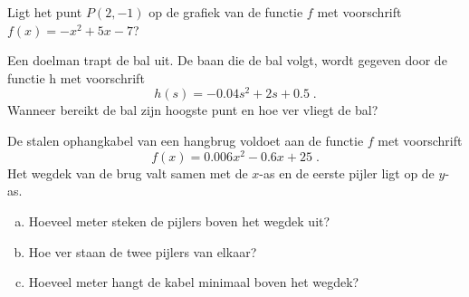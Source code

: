 \documentclass[12pt,twoside,a4paper]{article}
\begin{document}
\begin{oefening}
Ligt het punt $P(2,-1)$ op de grafiek van de functie $f$ met voorschrift $f(x)=-x^2+5x-7$?
\end{oefening}

\begin{oefening}
Een doelman trapt de bal uit. De baan die de bal volgt, wordt gegeven door de functie h met voorschrift
$$h(s)=-0.04s^2+2s+0.5\;.$$
Wanneer bereikt de bal zijn hoogste punt en hoe ver vliegt de bal?
\end{oefening}

\begin{oefening}
De stalen ophangkabel van een hangbrug voldoet aan de functie $f$ met voorschrift
$$f(x)=0.006x^2-0.6x+25\;.$$
Het wegdek van de brug valt samen met de $x$-as en de eerste pijler ligt op de $y$-as.
\begin{enumerate}[(a)]
  \item Hoeveel meter steken de pijlers boven het wegdek uit?
  \item Hoe ver staan de twee pijlers van elkaar?
  \item Hoeveel meter hangt de kabel minimaal boven het wegdek?
\end{enumerate}
\end{oefening}
\end{document}
